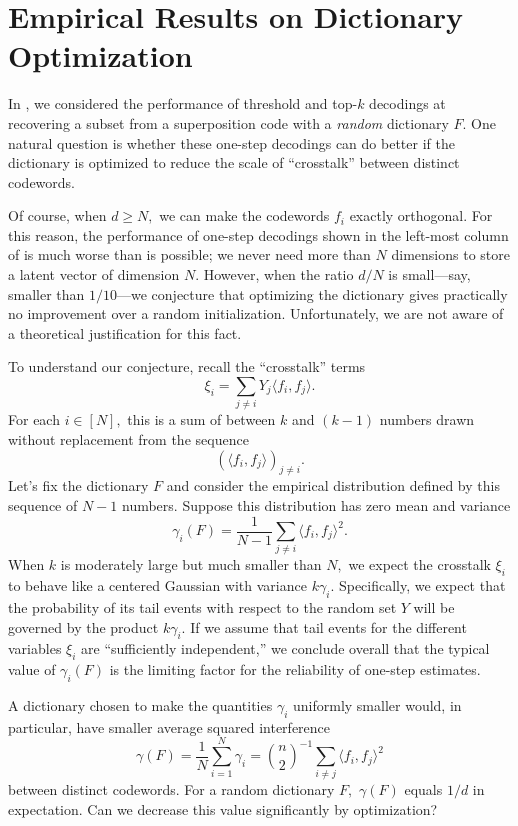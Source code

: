 \section{Empirical Results on Dictionary Optimization \label{appendix:gd_interference}}

In , we considered the performance of threshold and top-$k$ decodings at recovering a subset from a superposition code with a \textit{random} dictionary $F$. One natural question is whether these one-step decodings can do better if the dictionary is optimized to reduce the scale of ``crosstalk'' between distinct codewords.

Of course, when $d \ge N,$ we can make the codewords $f_i$ exactly orthogonal. For this reason, the performance of one-step decodings shown in the left-most column of  is much worse than is possible; we never need more than $N$ dimensions to store a latent vector of dimension $N.$ However, when the ratio $d/N$ is small---say, smaller than $1/10$---we conjecture that optimizing the dictionary gives practically no improvement over a random initialization. Unfortunately, we are not aware of a theoretical justification for this fact.

To understand our conjecture, recall the ``crosstalk'' terms
$$
	\xi_i = \sum_{j \neq i} Y_j \langle f_i, f_j \rangle.
$$
For each $i \in [N],$ this is a sum of between $k$ and $(k - 1)$ numbers drawn without replacement from the sequence
$$
	(\langle f_i, f_j \rangle)_{j \neq i}.
$$
Let's fix the dictionary $F$ and consider the empirical distribution defined by this sequence of $N - 1$ numbers. Suppose this distribution has zero mean and variance
$$
	\gamma_i(F) = \frac 1 {N - 1} \sum_{j \neq i} \langle f_i, f_j \rangle^2.
$$
When $k$ is moderately large but much smaller than $N,$ we expect the crosstalk $\xi_i$ to behave like a centered Gaussian with variance $k \gamma_i.$ Specifically, we expect that the probability of its tail events with respect to the random set $Y$ will be governed by the product $k \gamma_i.$ If we assume that tail events for the different variables $\xi_i$ are ``sufficiently independent,'' we conclude overall that the typical value of $\gamma_i(F)$ is the limiting factor for the reliability of one-step estimates.

A dictionary chosen to make the quantities $\gamma_i$ uniformly smaller would, in particular, have smaller average squared interference
$$
	\gamma(F) = \frac 1 N \sum_{i = 1}^N \gamma_i = \binom{n}{2}^{-1} \sum_{i \neq j} \langle f_i, f_j \rangle^2
$$
between distinct codewords. For a random dictionary $F,$ $\gamma(F)$ equals $1/d$ in expectation. Can we decrease this value significantly by optimization?


